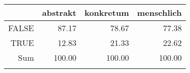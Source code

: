 \begin{tabular}{rrrr}
  \lsptoprule
 & abstrakt & konkretum & menschlich \\ 
  \midrule
FALSE & 87.17 & 78.67 & 77.38 \\ 
  TRUE & 12.83 & 21.33 & 22.62 \\ 
  Sum & 100.00 & 100.00 & 100.00 \\ 
   \lspbottomrule
\end{tabular}
